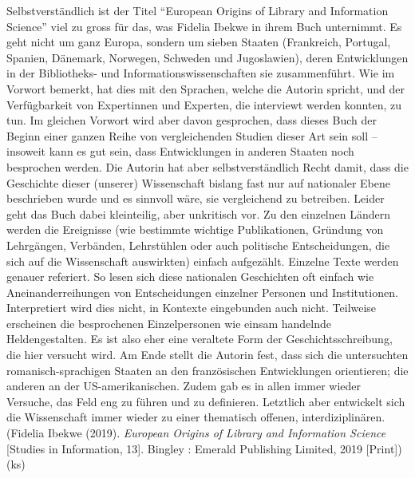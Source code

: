 \documentclass[a4paper,
fontsize=11pt,
oneside,
numbers=noperiodatend,
parskip=half-,
bibliography=totoc,
final
]{scrartcl}
\begin{document}
Selbstverständlich ist der Titel \enquote{European Origins of Library
and Information Science} viel zu gross für das, was Fidelia Ibekwe in
ihrem Buch unternimmt. Es geht nicht um ganz Europa, sondern um sieben
Staaten (Frankreich, Portugal, Spanien, Dänemark, Norwegen, Schweden und
Jugoslawien), deren Entwicklungen in der Bibliotheks- und
Informationswissenschaften sie zusammenführt. Wie im Vorwort bemerkt,
hat dies mit den Sprachen, welche die Autorin spricht, und der
Verfügbarkeit von Expertinnen und Experten, die interviewt werden
konnten, zu tun. Im gleichen Vorwort wird aber davon gesprochen, dass
dieses Buch der Beginn einer ganzen Reihe von vergleichenden Studien
dieser Art sein soll -- insoweit kann es gut sein, dass Entwicklungen in
anderen Staaten noch besprochen werden. Die Autorin hat aber
selbstverständlich Recht damit, dass die Geschichte dieser (unserer)
Wissenschaft bislang fast nur auf nationaler Ebene beschrieben wurde und
es sinnvoll wäre, sie vergleichend zu betreiben. Leider geht das Buch
dabei kleinteilig, aber unkritisch vor. Zu den einzelnen Ländern werden
die Ereignisse (wie bestimmte wichtige Publikationen, Gründung von
Lehrgängen, Verbänden, Lehrstühlen oder auch politische Entscheidungen,
die sich auf die Wissenschaft auswirkten) einfach aufgezählt. Einzelne
Texte werden genauer referiert. So lesen sich diese nationalen
Geschichten oft einfach wie Aneinanderreihungen von Entscheidungen
einzelner Personen und Institutionen. Interpretiert wird dies nicht, in
Kontexte eingebunden auch nicht. Teilweise erscheinen die besprochenen
Einzelpersonen wie einsam handelnde Heldengestalten. Es ist also eher
eine veraltete Form der Geschichtsschreibung, die hier versucht wird. Am
Ende stellt die Autorin fest, dass sich die untersuchten
romanisch-sprachigen Staaten an den französischen Entwicklungen
orientieren; die anderen an der US-amerikanischen. Zudem gab es in allen
immer wieder Versuche, das Feld eng zu führen und zu definieren.
Letztlich aber entwickelt sich die Wissenschaft immer wieder zu einer
thematisch offenen, interdiziplinären. (Fidelia Ibekwe (2019).
\emph{European Origins of Library and Information Science} {[}Studies in
Information, 13{]}. Bingley : Emerald Publishing Limited, 2019
{[}Print{]}) (ks)
\end{document}

